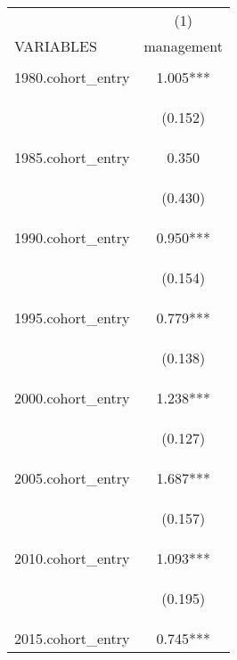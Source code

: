 \begin{center}
\begin{tabular}{lc} \hline
 & (1) \\
VARIABLES & management \\ \hline
\vspace{4pt} & \begin{footnotesize}\end{footnotesize} \\
1980.cohort\_entry & 1.005*** \\
\vspace{4pt} & \begin{footnotesize}(0.152)\end{footnotesize} \\
1985.cohort\_entry & 0.350 \\
\vspace{4pt} & \begin{footnotesize}(0.430)\end{footnotesize} \\
1990.cohort\_entry & 0.950*** \\
\vspace{4pt} & \begin{footnotesize}(0.154)\end{footnotesize} \\
1995.cohort\_entry & 0.779*** \\
\vspace{4pt} & \begin{footnotesize}(0.138)\end{footnotesize} \\
2000.cohort\_entry & 1.238*** \\
\vspace{4pt} & \begin{footnotesize}(0.127)\end{footnotesize} \\
2005.cohort\_entry & 1.687*** \\
\vspace{4pt} & \begin{footnotesize}(0.157)\end{footnotesize} \\
2010.cohort\_entry & 1.093*** \\
\vspace{4pt} & \begin{footnotesize}(0.195)\end{footnotesize} \\
2015.cohort\_entry & 0.745*** \\

\end{tabular}
\end{center}
